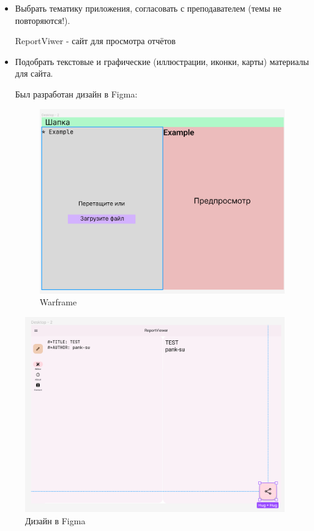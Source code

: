 \documentclass[14pt]{extarticle}
\begin{document}
\begin{itemize}
\item Выбрать тематику приложения, согласовать с преподавателем (темы не повторяются!).

ReportViwer - сайт для просмотра отчётов

\item Подобрать текстовые и графические (иллюстрации, иконки, карты) материалы для сайта.

Был разработан дизайн в Figma:

\begin{figure}[H]
\centering
\includegraphics[width=.9\linewidth]{images/20230323-122737_screenshot.png}
\caption{Warframe}
\end{figure}
\end{itemize}


\begin{figure}[H]
\centering
\includegraphics[width=.9\linewidth]{images/20230323-122438_screenshot.png}
\caption{Дизайн в Figma}
\end{figure}
\end{document}
